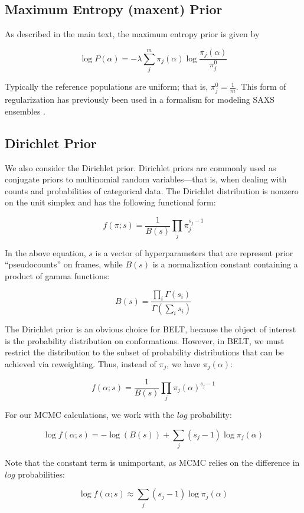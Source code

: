 \documentclass[12pt]{article}
\begin{document}
\subsection*{Maximum Entropy (maxent) Prior}

As described in the main text, the maximum entropy prior is given by 

$$\log P(\alpha) = -\lambda \sum_j^m \pi_j(\alpha) \log \frac{\pi_j(\alpha)}{\pi_j^0}$$

Typically the reference populations are uniform; that is, $\pi_j^0 = \frac{1}{m}$.  This form of regularization has previously been used in a formalism for modeling SAXS ensembles \cite{rozycki2011saxs}.  

\subsection*{Dirichlet Prior}

We also consider the Dirichlet prior.  Dirichlet priors are commonly used as conjugate priors to multinomial random variables---that is, when dealing with counts and probabilities of categorical data.  The Dirichlet distribution is nonzero on the unit simplex and has the following functional form:

$$f(\pi;s) = \frac{1}{B(s)} \prod_j \pi_j^{s_j - 1}$$

In the above equation, $s$ is a vector of hyperparameters that are represent prior ``pseudocounts'' on frames, while $B(s)$ is a normalization constant containing a product of gamma functions:

$$B(s) = \frac{\prod_i \Gamma(s_i)}{\Gamma(\sum_i s_i)}$$

The Dirichlet prior is an obvious choice for BELT, because the object of interest is the probability distribution on conformations.  However, in BELT, we must restrict the distribution to the subset of probability distributions that can be achieved via reweighting.  Thus, instead of $\pi_j$, we have $\pi_j(\alpha)$:

$$f(\alpha;s) = \frac{1}{B(s)} \prod_j \pi_j(\alpha)^{s_j - 1}$$

For our MCMC calculations, we work with the $log$ probability:

$$\log f(\alpha;s) = -\log(B(s)) + \sum_j (s_j - 1) \log \pi_j(\alpha)$$

Note that the constant term is unimportant, as MCMC relies on the difference in $log$ probabilities:

$$\log f(\alpha;s) \approx \sum_j (s_j - 1) \log \pi_j(\alpha)$$
\end{document}

